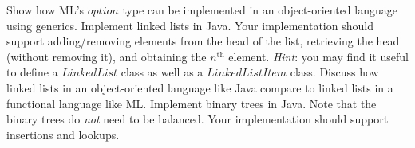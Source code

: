 \documentclass[10pt,a4paper]{exam}
\begin{document}
\begin{questions}
\question[4] Show how ML's $\mathit{option}$ type can be implemented in an object-oriented language using generics. \droppoints 
\question[10] Implement linked lists in Java. Your implementation should support adding/removing elements from the head of the list, retrieving the head (without removing it), and obtaining the $n^{\text{th}}$ element. \emph{Hint}: you may find it useful to define a $\mathit{LinkedList}$ class as well as a $\mathit{LinkedListItem}$ class. \droppoints 
\question[4] Discuss how linked lists in an object-oriented language like Java compare to linked lists in a functional language like ML. \droppoints 
\question[15] Implement binary trees in Java. Note that the binary trees do \emph{not} need to be balanced. Your implementation should support insertions and lookups. \droppoints 

\end{questions}
\end{document}
